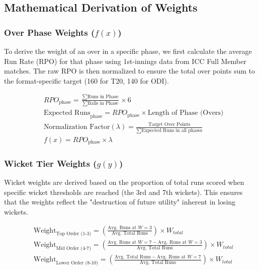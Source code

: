 \documentclass[12pt, letterpaper, fleqn]{article}
\begin{document}
\subsection{Mathematical Derivation of Weights}

\subsubsection{Over Phase Weights ($f(x)$)}
\indent To derive the weight of an over in a specific phase, we first calculate the average Run Rate (RPO) for that phase using 1st-innings data from ICC Full Member matches. The raw RPO is then normalized to ensure the total over points sum to the format-specific target (160 for T20, 140 for ODI).

\begin{align*}
& RPO_{\text{phase}} = \frac{\sum \text{Runs in Phase}}{\sum \text{Balls in Phase}} \times 6 \\
& \text{Expected Runs}_{\text{phase}} = RPO_{\text{phase}} \times \text{Length of Phase (Overs)} \\
& \text{Normalization Factor} (\lambda) = \frac{\text{Target Over Points}}{\sum \text{Expected Runs in all phases}} \\
& f(x) = RPO_{\text{phase}} \times \lambda
\end{align*}

\subsubsection{Wicket Tier Weights ($g(y)$)}
\indent Wicket weights are derived based on the proportion of total runs scored when specific wicket thresholds are reached (the 3rd and 7th wickets). This ensures that the weights reflect the "destruction of future utility" inherent in losing wickets.

\begin{align*}
& \text{Weight}_{\text{Top Order (1-3)}} = \left( \frac{\text{Avg. Runs at } W=3}{\text{Avg. Total Runs}} \right) \times W_{total} \\
& \text{Weight}_{\text{Mid Order (4-7)}} = \left( \frac{\text{Avg. Runs at } W=7 - \text{Avg. Runs at } W=3}{\text{Avg. Total Runs}} \right) \times W_{total} \\
& \text{Weight}_{\text{Lower Order (8-10)}} = \left( \frac{\text{Avg. Total Runs} - \text{Avg. Runs at } W=7}{\text{Avg. Total Runs}} \right) \times W_{total}
\end{align*}
\end{document}
